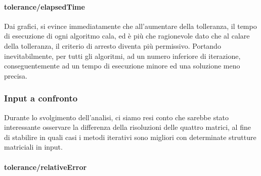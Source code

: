 \paragraph{tolerance/elapsedTime}


Dai grafici, si evince immediatamente che all'aumentare della tolleranza, il tempo di esecuzione di ogni algoritmo cala, ed è più che ragionevole dato che al calare della tolleranza, il criterio di arresto diventa più permissivo.
Portando inevitabilmente, per tutti gli algoritmi, ad un numero inferiore di iterazione, conseguentemente ad un tempo di esecuzione minore ed una soluzione meno precisa.


\subsubsection{Input a confronto}
Durante lo svolgimento dell'analisi, ci siamo resi conto che sarebbe stato interessante osservare la differenza della risoluzioni delle quattro matrici, al fine di stabilire in quali casi i metodi iterativi sono migliori con determinate strutture matriciali in input.

\paragraph{tolerance/relativeError}



